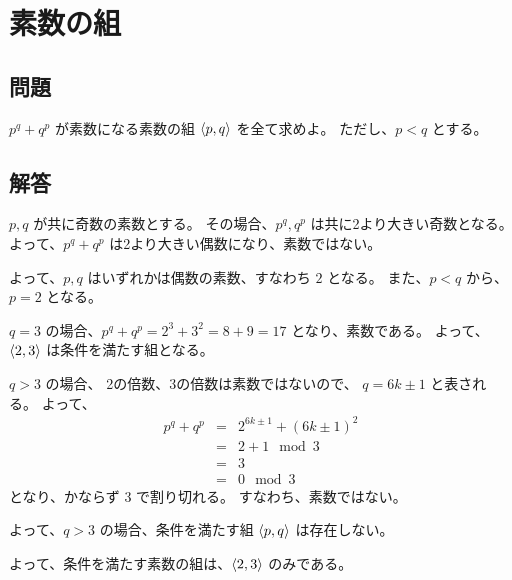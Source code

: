 \section{素数の組}
\label{s:素数の組}

\subsection{問題}
\label{ssec:素数の組:問題}

$p^q + q^p$ が素数になる素数の組 $\left< p,q \right>$ を全て求めよ。
ただし、$p<q$ とする。

\clearpage
\subsection{解答}
\label{ssec:素数の組:解答}

$p,q$ が共に奇数の素数とする。
その場合、$p^q, q^p$ は共に2より大きい奇数となる。
よって、$p^q + q^p$ は2より大きい偶数になり、素数ではない。

よって、$p,q$ はいずれかは偶数の素数、すなわち $2$ となる。
また、$p < q$ から、$p = 2$ となる。

$q = 3$ の場合、$p^q + q^p = 2^3 + 3^2 = 8 + 9 = 17$ となり、素数である。
よって、 $\left< 2,3 \right>$ は条件を満たす組となる。

$q > 3$ の場合、
2の倍数、3の倍数は素数ではないので、
$q = 6k \pm 1$ と表される。
よって、
  \begin{eqnarray}
    p^q + q^p
      & = &
        2^{6 k \pm 1} + (6 k \pm 1)^2
  \\
      & = &
        2 + 1   \mod 3
  \\
      & = &
        3
  \\
      & = &
        0   \mod 3
  \end{eqnarray}
となり、かならず 3 で割り切れる。
すなわち、素数ではない。

よって、$q > 3$ の場合、条件を満たす組 $\left< p,q \right>$ は存在しない。

よって、条件を満たす素数の組は、$\left< 2,3 \right>$ のみである。
\QED





